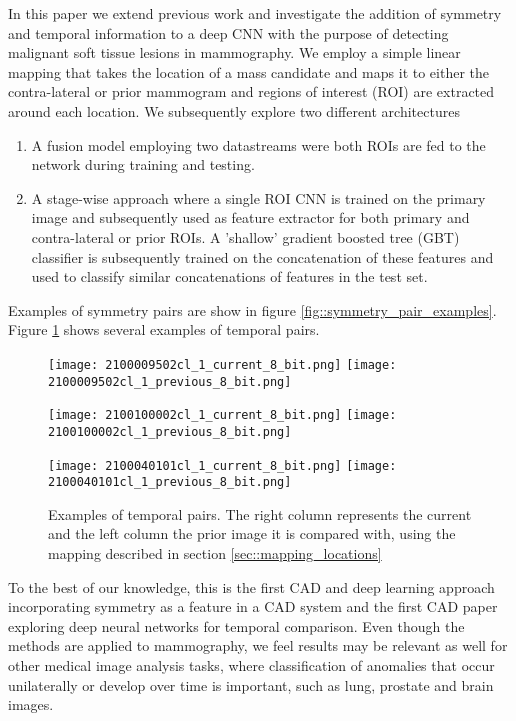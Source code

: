 \documentclass[12pt]{spieman}  %
\begin{document}
In this paper we extend previous work \cite{Kooi17b} and investigate the addition of symmetry and temporal information to a deep CNN with the purpose of detecting malignant soft tissue lesions in mammography. We employ a simple linear mapping that takes the location of a mass candidate and maps it to either the contra-lateral or prior mammogram and regions of interest (ROI) are extracted around each location. We subsequently explore two different architectures
\begin{enumerate}
 \item A fusion model employing two datastreams were both ROIs are fed to the network during training and testing.
 \item A stage-wise approach where a single ROI CNN is trained on the primary image and subsequently used as feature extractor for both primary and contra-lateral or prior ROIs. A 'shallow' gradient boosted tree (GBT) classifier is subsequently trained on the concatenation of these features and used to classify similar concatenations of features in the test set. 
\end{enumerate}
Examples of symmetry pairs are show in figure \ref{fig::symmetry_pair_examples}. Figure \ref{fig::temporal_pair_examples} shows several examples of temporal pairs. \\

\begin{figure}
 \centering
 \texttt{[image: 2100009502cl\_1\_current\_8\_bit.png]}
 \texttt{[image: 2100009502cl\_1\_previous\_8\_bit.png]} \\\vspace{0.4cm}
 
 \texttt{[image: 2100100002cl\_1\_current\_8\_bit.png]}
 \texttt{[image: 2100100002cl\_1\_previous\_8\_bit.png]} \\\vspace{0.4cm}
 
  \texttt{[image: 2100040101cl\_1\_current\_8\_bit.png]}
 \texttt{[image: 2100040101cl\_1\_previous\_8\_bit.png]} \\
 \caption{Examples of temporal pairs. The right column represents the current and the left column the prior image it is compared with, using the mapping described in section \ref{sec::mapping_locations}}
 \label{fig::temporal_pair_examples}
\end{figure}

To the best of our knowledge, this is the first CAD and deep learning approach incorporating symmetry as a feature in a CAD system and the first CAD paper exploring deep neural networks for temporal comparison. Even though the methods are applied to mammography, we feel results may be relevant as well for other medical image analysis tasks, where classification of anomalies that occur unilaterally or develop over time is important, such as lung, prostate and brain images. \\
\end{document}
